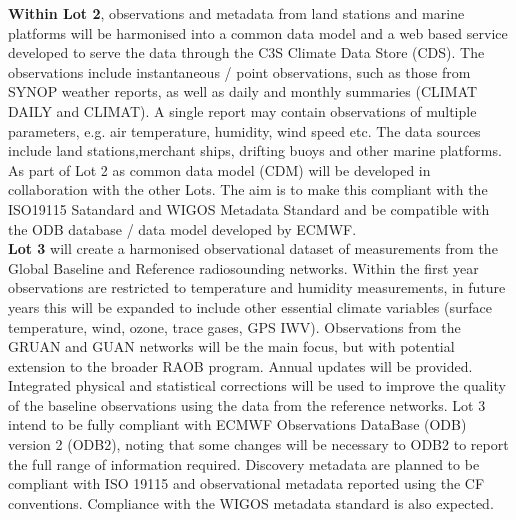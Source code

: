 \documentclass[a4paper]{article}
\begin{document}
\textbf{Within Lot 2}, observations and metadata from land stations and marine platforms will be harmonised into a common data model and a web based service developed to serve the data through the C3S Climate Data Store (CDS). The observations include instantaneous / point observations, such as those from SYNOP weather reports, as well as daily and monthly summaries (CLIMAT DAILY and CLIMAT). A single report may contain observations of multiple parameters, e.g. air temperature, humidity, wind speed etc. The data sources include land stations,merchant ships, drifting buoys and other marine platforms. As part of Lot 2 as common data model (CDM) will be developed in collaboration with the other Lots. The aim is to make this compliant with the ISO19115 Satandard and WIGOS Metadata Standard and be compatible with the ODB database / data model developed by ECMWF.\\

\textbf{Lot 3} will create a harmonised observational dataset of measurements from the Global Baseline and Reference radiosounding networks. Within the first year observations are restricted to temperature and humidity measurements, in future years this will be expanded to include other essential climate variables (surface temperature, wind, ozone, trace gases, GPS IWV). Observations from the GRUAN and GUAN networks will be the main focus, but with potential extension to the broader RAOB program. Annual updates will be provided. Integrated physical and statistical corrections will be used to improve the quality of the baseline observations using the data from the reference networks. Lot 3 intend to be fully compliant with ECMWF Observations DataBase (ODB) version 2 (ODB2), noting that some changes will be necessary to ODB2 to report the full range of information required. Discovery metadata are planned to be compliant with ISO 19115 and observational metadata reported using the CF conventions. Compliance with the WIGOS metadata standard is also expected. \\
\end{document}

